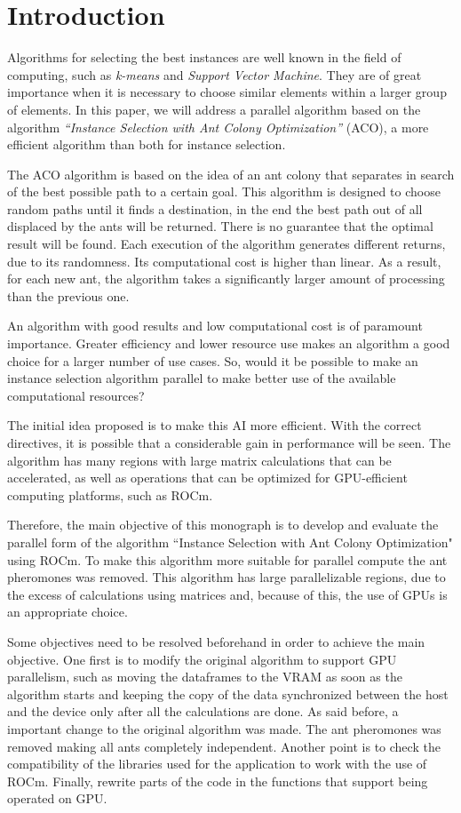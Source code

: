 \section{Introduction}

Algorithms for selecting the best instances are well known in the field of computing, such as \emph{k-means} and \emph{Support Vector Machine}. They are of great importance when it is necessary to choose similar elements within a larger group of elements. In this paper, we will address a parallel algorithm based on the algorithm \emph{``Instance Selection with Ant Colony Optimization''} (ACO), a more efficient algorithm than both for instance selection.

The ACO algorithm is based on the idea of an ant colony that separates in search of the best possible path to a certain goal. This algorithm is designed to choose random paths until it finds a destination, in the end the best path out of all displaced by the ants will be returned. There is no guarantee that the optimal result will be found. Each execution of the algorithm generates different returns, due to its randomness. Its computational cost is higher than linear. As a result, for each new ant, the algorithm takes a significantly larger amount of processing than the previous one.

An algorithm with good results and low computational cost is of paramount importance. Greater efficiency and lower resource use makes an algorithm a good choice for a larger number of use cases. So, would it be possible to make an instance selection algorithm parallel to make better use of the available computational resources?

The initial idea proposed is to make this AI more efficient. With the correct directives, it is possible that a considerable gain in performance will be seen. The algorithm has many regions with large matrix calculations that can be accelerated, as well as operations that can be optimized for GPU-efficient computing platforms, such as ROCm.

Therefore, the main objective of this monograph is to develop and evaluate the parallel form of the algorithm ``Instance Selection with Ant Colony Optimization" using ROCm. To make this algorithm more suitable for parallel compute the ant pheromones was removed.
This algorithm has large parallelizable regions, due to the excess of calculations using matrices and, because of this, the use of GPUs is an appropriate choice.

Some objectives need to be resolved beforehand in order to achieve the main objective. One first is to modify the original algorithm to support GPU parallelism, such as moving the dataframes to the VRAM as soon as the algorithm starts and keeping the copy of the data synchronized between the host and the device only after all the calculations are done.
As said before, a important change to the original algorithm was made. The ant pheromones was removed making all ants completely independent.
Another point is to check the compatibility of the libraries used for the application to work with the use of ROCm. Finally, rewrite parts of the code in the functions that support being operated on GPU.

